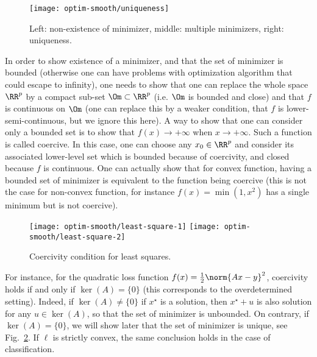 \begin{figure}
\centering
\texttt{[image: optim-smooth/uniqueness]}
\caption{\label{fig-minimizer-exists}
Left: non-existence of minimizer, middle: multiple minimizers, right: uniqueness.
}
\end{figure}

In order to show existence of a minimizer, and that the set of minimizer is bounded (otherwise one can have problems with optimization algorithm that could escape to infinity), one needs to show that one can replace the whole space $\RR^p$ by a compact sub-set $\Om \subset \RR^p$ (i.e. $\Om$ is bounded and close) and that $f$ is continuous on $\Om$ (one can replace this by a weaker condition, that $f$ is lower-semi-continuous, but we ignore this here).  A way to show that one can consider only a bounded set is to show that $f(x) \rightarrow +\infty$ when $x \rightarrow +\infty$. Such a function is called coercive. In this case, one can choose any $x_0 \in \RR^p$ and consider its associated lower-level set
which is bounded because of coercivity, and closed because $f$ is continuous. One can actually show that for convex function, having a bounded set of minimizer is equivalent to the function being coercive (this is not the case for non-convex function, for instance $f(x)=\min(1,x^2)$ has a single minimum but is not coercive). 

\begin{figure}
\centering
\texttt{[image: optim-smooth/least-square-1]} \quad
\texttt{[image: optim-smooth/least-square-2]} 
\caption{\label{fig-least-square}
Coercivity condition for least squares.
}
\end{figure}

\begin{exmp}
For instance, for the quadratic loss function $f(x)=\frac{1}{2}\norm{Ax-y}^2$, coercivity holds if and only if $\ker(A)=\{0\}$ (this corresponds to the overdetermined setting). Indeed, if $\ker(A) \neq \{0\}$ if $x^\star$ is a solution, then $x^\star+u$ is also solution for any $u \in \ker(A)$, so that the set of minimizer is unbounded.
%
On contrary, if $\ker(A) = \{0\}$, we will show later that the set of minimizer is unique, see Fig.~\ref{fig-least-square}. 
%
If $\ell$ is strictly convex, the same conclusion holds in the case of classification.
\end{exmp}

